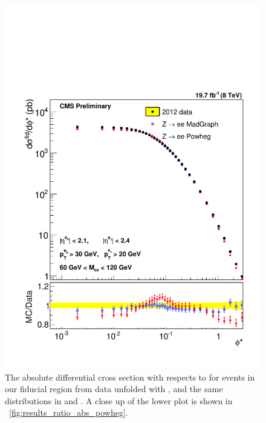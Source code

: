 \begin{figure}[!p]
    \centering
    \includegraphics[width=\textwidth]{figures/ZShape_elec_PH_Abs_Dressed.pdf}
    \caption[
        The absolute differential cross section with respects to \phistar for
        \Ztoee events in our fiducial region from data unfolded with \POWHEG,
        and the same distributions in \MADGRAPH and \POWHEG.
    ]{
        The absolute differential cross section with respects to \phistar for
        \Ztoee events in our fiducial region from data unfolded with \POWHEG,
        and the same distributions in \MADGRAPH and \POWHEG. A close up of the
        lower plot is shown in \FIG~\ref{fig:results_ratio_abs_powheg}.
    }
    \label{fig:results_abs_powheg}
\end{figure}


